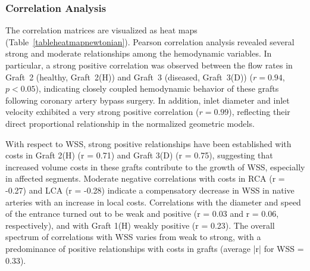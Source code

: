 ﻿\documentclass[12pt,a4paper]{article}
\newcounter{subsubsubsection}[subsubsection]
\theoremstyle{definition}
\numberwithin{equation}{section}
\begin{document}
\subsubsection{Correlation Analysis}
The correlation matrices are visualized as heat maps (Table~\ref{tableheatmapnewtonian}). Pearson correlation analysis revealed several strong and moderate relationships among the hemodynamic variables. In particular, a strong positive correlation was observed between the flow rates in Graft~2 (healthy, Graft~2(H)) and Graft~3 (diseased, Graft~3(D)) (\(r = 0.94\), \(p < 0.05\)), indicating closely coupled hemodynamic behavior of these grafts following coronary artery bypass surgery. In addition, inlet diameter and inlet velocity exhibited a very strong positive correlation (\(r = 0.99\)), reflecting their direct proportional relationship in the normalized geometric models.



With respect to WSS, strong positive relationships have been established with costs in Graft 2(H) (r = 0.71) and Graft 3(D) (r = 0.75), suggesting that increased volume costs in these grafts contribute to the growth of WSS, especially in affected segments. Moderate negative correlations with costs in RCA (r = -0.27) and LCA (r = -0.28) indicate a compensatory decrease in WSS in native arteries with an increase in local costs. Correlations with the diameter and speed of the entrance turned out to be weak and positive (r = 0.03 and r = 0.06, respectively), and with Graft 1(H) weakly positive (r = 0.23). The overall spectrum of correlations with WSS varies from weak to strong, with a predominance of positive relationships with costs in grafts (average |r| for WSS = 0.33).
\end{document}
